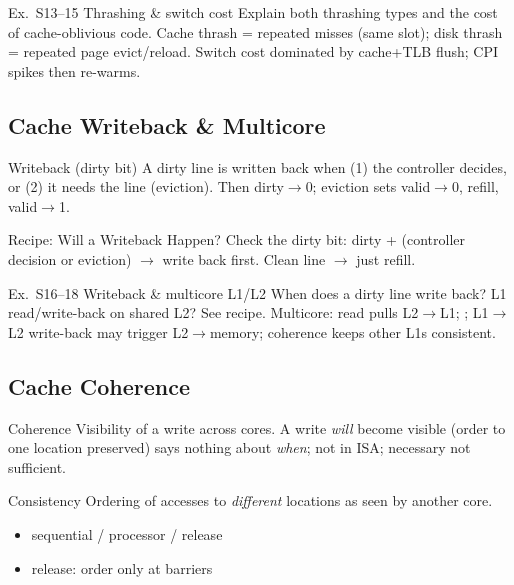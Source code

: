 \multend

\begin{example2}{Ex.\ S13--15 Thrashing \& switch cost}
    Explain both thrashing types and the cost of cache-oblivious code.
    \tcblower
    Cache thrash = repeated misses (same slot); disk thrash = repeated page evict/reload. Switch cost dominated by cache+TLB flush; CPI spikes then re-warms.
\end{example2}

\subsection{Cache Writeback \& Multicore}

\begin{definition}{Writeback (dirty bit)}
    A dirty line is written back when (1) the controller decides, or (2) it needs the line (eviction). Then dirty$\to$0; eviction sets valid$\to$0, refill, valid$\to$1.
\end{definition}

\begin{KR}{Recipe: Will a Writeback Happen?}
    Check the dirty bit: dirty + (controller decision or eviction) $\to$ write back first. Clean line $\to$ just refill.
\end{KR}

\begin{example2}{Ex.\ S16--18 Writeback \& multicore L1/L2}
    When does a dirty line write back? L1 read/write-back on shared L2?
    \tcblower
    See recipe. Multicore: read pulls L2$\to$L1; ; L1$\to$L2 write-back may trigger L2$\to$memory; coherence keeps other L1s consistent.
\end{example2}

\subsection{Cache Coherence}


\begin{definition}{Coherence}
    Visibility of a write across cores. A write \emph{will} become visible (order to one location preserved) says nothing about \emph{when}; not in ISA; necessary not sufficient.
\end{definition}

\begin{definition}{Consistency}
    Ordering of accesses to \emph{different} locations as seen by another core.
    \begin{itemize}
        \item sequential / processor / release
        \item release: order only at barriers
    \end{itemize}
\end{definition}

